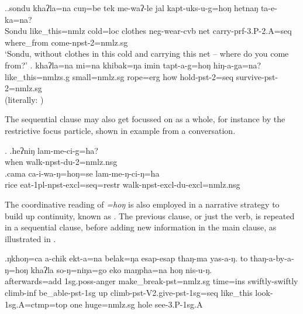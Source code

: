 \ex.\ag.\label{ex_sondu}sondu  khaʔla=na      cuŋ=be  tek   me-waʔ-le  jal kapt-uks-u-g=hoŋ hetnaŋ    ta-e-ka=na?\\
		Sondu like\_this={\sc nmlz} cold={\sc loc} clothes {\sc neg}-wear-{\sc cvb} net carry{\sc -prf-3.P-2.A=seq}  where\_from come{\sc -npst-2=nmlz.sg}\\
		‘Sondu, without clothes in this cold and carrying this net – where do you come from?’ 	
\bg. khaʔla=na          mi=na  khibak=ŋa   imin tapt-a-g=hoŋ          hiŋ-a-ga=na?\\
like\_this{\sc =nmlzs.g} small{\sc =nmlz.sg} rope{\sc =erg} how hold{\sc -pst-2=seq} survive{\sc -pst-2=nmlz.sg} \\
 (literally: ) 

		
The sequential clause may also get focussed on as a whole, for instance by the restrictive focus particle, shown in example \Next from a conversation. 
		
		\ex. \ag.heʔniŋ lam-me-ci-g=ha?\\
		when walk{\sc -npst-du-2=nmlz.nsg}\\
		\bg.cama ca-i-wa-ŋ=hoŋ=se lam-me-ŋ-ci-ŋ=ha \\
		rice eat{\sc -1pl-npst-excl=seq=restr} walk{\sc -npst-excl-du-excl=nmlz.nsg}\\

	
The coordinative reading of  \emph{=hoŋ} is also employed in a narrative strategy  to build up continuity, known as  \citep[39]{Ebert2003Equivalents}. The previous clause, or just the verb, is repeated in a sequential clause, before adding new information in the main clause, as illustrated in \Next.

\exg.ŋkhoŋ=ca  a-chik ekt-a=na belak=ŋa  esap-esap thaŋ-ma    yas-a-ŋ. to  thaŋ-a-by-a-ŋ=hoŋ khaʔla   so-ŋ=niŋa=go eko maŋpha=na hoŋ nis-u-ŋ.\\
afterwards{\sc =add} {\sc 1sg.poss-}anger make\_break{\sc -pst=nmlz.sg} time{\sc =ins} swiftly-swiftly climb{\sc -inf} be\_able{\sc -pst-1sg} up climb{\sc -pst-V2.give-pst-1sg=seq} like\_this look{\sc [pst]-1sg.A=ctmp=top} one huge{\sc =nmlz.sg} hole see{\sc [pst]-3.P-1sg.A}\\
 

